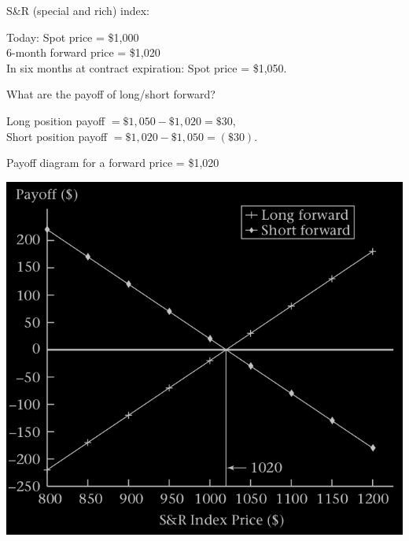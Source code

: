 \begin{frame}[fragile,t]
	\begin{myexample}
	  S\&R (special and rich) index:
		\begin{center}
			Today: Spot price = \$1,000\\
			6-month forward price = \$1,020 \\
			In six months at contract expiration: Spot price = \$1,050.
		\end{center}
		What are the payoff of long/short forward?
	\end{myexample}
	\bigskip
	\pause
	\begin{mysol}
		\begin{center}
		Long position payoff $=\$1,050-\$1,020 = \$30$, \\ \bigskip
		Short position payoff $= \$1,020-\$1,050 = (\$30)$.
		\end{center}
		\myEnd
	\end{mysol}
\end{frame}
\begin{frame}[fragile,t]
\begin{center}
	Payoff diagram for a forward price = \$1,020 \\
	\bigskip

	\includegraphics[scale=0.2]{figs/Figure-2-2.png}
\end{center}
\end{frame}
